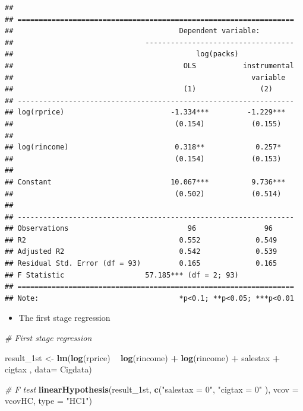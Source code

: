 \documentclass[]{book}
\newenvironment{Shaded}{\begin{snugshade}}{\end{snugshade}}
\newcommand{\KeywordTok}[1]{\textcolor[rgb]{0.13,0.29,0.53}{\textbf{#1}}}
\newcommand{\DataTypeTok}[1]{\textcolor[rgb]{0.13,0.29,0.53}{#1}}
\newcommand{\StringTok}[1]{\textcolor[rgb]{0.31,0.60,0.02}{#1}}
\newcommand{\CommentTok}[1]{\textcolor[rgb]{0.56,0.35,0.01}{\textit{#1}}}
\newcommand{\OperatorTok}[1]{\textcolor[rgb]{0.81,0.36,0.00}{\textbf{#1}}}
\newcommand{\NormalTok}[1]{#1}
\providecommand{\tightlist}{%
  \setlength{\itemsep}{0pt}\setlength{\parskip}{0pt}}
\begin{document}
\begin{verbatim}
## 
## =================================================================
##                                       Dependent variable:        
##                               -----------------------------------
##                                           log(packs)             
##                                        OLS           instrumental
##                                                        variable  
##                                        (1)               (2)     
## -----------------------------------------------------------------
## log(rprice)                         -1.334***         -1.229***  
##                                      (0.154)           (0.155)   
##                                                                  
## log(rincome)                         0.318**            0.257*   
##                                      (0.154)           (0.153)   
##                                                                  
## Constant                            10.067***          9.736***  
##                                      (0.502)           (0.514)   
##                                                                  
## -----------------------------------------------------------------
## Observations                            96                96     
## R2                                    0.552             0.549    
## Adjusted R2                           0.542             0.539    
## Residual Std. Error (df = 93)         0.165             0.165    
## F Statistic                   57.185*** (df = 2; 93)             
## =================================================================
## Note:                                 *p<0.1; **p<0.05; ***p<0.01
\end{verbatim}

\begin{itemize}
\tightlist
\item
  The first stage regression
\end{itemize}

\begin{Shaded}
\begin{Highlighting}[]
\CommentTok{# First stage regression }

\NormalTok{result_1st <-}\StringTok{ }\KeywordTok{lm}\NormalTok{(}\KeywordTok{log}\NormalTok{(rprice) }\OperatorTok{~}\StringTok{ }\KeywordTok{log}\NormalTok{(rincome) }\OperatorTok{+}\StringTok{ }\KeywordTok{log}\NormalTok{(rincome) }\OperatorTok{+}\StringTok{ }\NormalTok{salestax }\OperatorTok{+}\StringTok{ }\NormalTok{cigtax , }\DataTypeTok{data=}\NormalTok{ Cigdata)}

\CommentTok{# F test}
\KeywordTok{linearHypothesis}\NormalTok{(result_1st, }
                 \KeywordTok{c}\NormalTok{(}\StringTok{"salestax = 0"}\NormalTok{, }\StringTok{"cigtax = 0"}\NormalTok{ ), }
                 \DataTypeTok{vcov =}\NormalTok{ vcovHC, }\DataTypeTok{type =} \StringTok{"HC1"}\NormalTok{)}
\end{Highlighting}
\end{Shaded}
\end{document}
